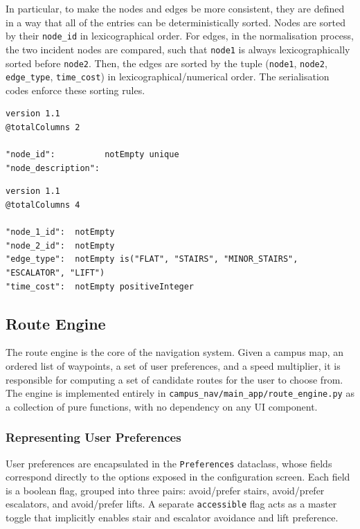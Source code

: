 \documentclass[a4paper,10pt]{amsart}
\begin{document}
In particular, to make the nodes and edges be more consistent, they are defined in a way that all of the entries can be deterministically sorted.
Nodes are sorted by their \texttt{node\_id} in lexicographical order.
For edges, in the normalisation process, the two incident nodes are compared, such that \texttt{node1} is always lexicographically sorted before \texttt{node2}.
Then, the edges are sorted by the tuple (\texttt{node1}, \texttt{node2}, \texttt{edge\_type}, \texttt{time\_cost}) in lexicographical/numerical order.
The serialisation codes enforce these sorting rules.

\begin{lstlisting}[caption={CSV Schema for \texttt{nodes.csv}},float=htbp,label={lst:nodes_csv_schema}]
version 1.1
@totalColumns 2

"node_id":          notEmpty unique
"node_description":
\end{lstlisting}

\begin{lstlisting}[caption={CSV Schema for \texttt{edges.csv}},float=htbp,label={lst:edges_csv_schema}]
version 1.1
@totalColumns 4

"node_1_id":  notEmpty
"node_2_id":  notEmpty
"edge_type":  notEmpty is("FLAT", "STAIRS", "MINOR_STAIRS", "ESCALATOR", "LIFT")
"time_cost":  notEmpty positiveInteger
\end{lstlisting}

\subsection{Route Engine}

The route engine is the core of the navigation system.
Given a campus map, an ordered list of waypoints, a set of user preferences, and a speed multiplier, it is responsible for computing a set of candidate routes for the user to choose from.
The engine is implemented entirely in \texttt{campus\_nav/main\_app/route\_engine.py} as a collection of pure functions, with no dependency on any UI component.

\subsubsection{Representing User Preferences}

User preferences are encapsulated in the \texttt{Preferences} dataclass, whose fields correspond directly to the options exposed in the configuration screen.
Each field is a boolean flag, grouped into three pairs: avoid/prefer stairs, avoid/prefer escalators, and avoid/prefer lifts.
A separate \texttt{accessible} flag acts as a master toggle that implicitly enables stair and escalator avoidance and lift preference.
\end{document}
